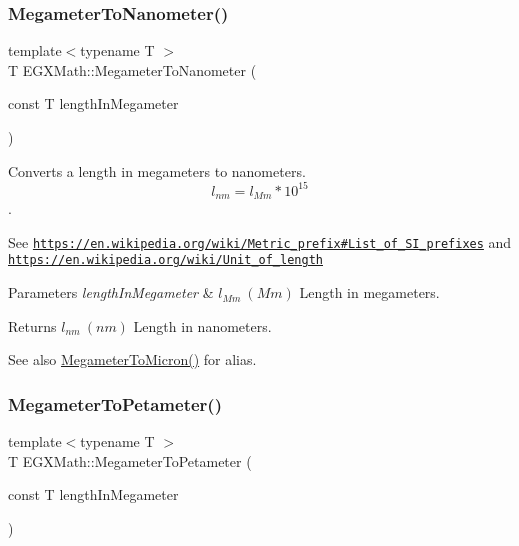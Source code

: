 \subsubsection{\texorpdfstring{Megameter\+To\+Nanometer()}{MegameterToNanometer()}}
{\footnotesize\ttfamily template$<$typename T $>$ \\
T E\+G\+X\+Math\+::\+Megameter\+To\+Nanometer (\begin{DoxyParamCaption}\item[{const T}]{length\+In\+Megameter }\end{DoxyParamCaption})}



Converts a length in megameters to nanometers. \[ l_{nm}=l_{Mm} * 10^{15} \]. 

See \href{https://en.wikipedia.org/wiki/Metric_prefix#List_of_SI_prefixes}{\tt https\+://en.\+wikipedia.\+org/wiki/\+Metric\+\_\+prefix\#\+List\+\_\+of\+\_\+\+S\+I\+\_\+prefixes} and \href{https://en.wikipedia.org/wiki/Unit_of_length}{\tt https\+://en.\+wikipedia.\+org/wiki/\+Unit\+\_\+of\+\_\+length} 
\begin{DoxyParams}{Parameters}
{\em length\+In\+Megameter} & $ l_{Mm}\ (Mm)$ Length in megameters. \\
\hline
\end{DoxyParams}
\begin{DoxyReturn}{Returns}
$ l_{nm}\ (nm)$ Length in nanometers. 
\end{DoxyReturn}
\begin{DoxySeeAlso}{See also}
\mbox{\hyperlink{group___e_g_x_math-_conversions-_length_conversions-_megameter-_non-_s_i_ga14e6b356b28257b1bde9cb9ebf6bc3c6}{Megameter\+To\+Micron()}} for alias. 
\end{DoxySeeAlso}
\mbox{\label{group___e_g_x_math-_conversions-_length_conversions-_megameter-_s_i_gad40646b8456e092061f26bc6c6c65925}} 
\subsubsection{\texorpdfstring{Megameter\+To\+Petameter()}{MegameterToPetameter()}}
{\footnotesize\ttfamily template$<$typename T $>$ \\
T E\+G\+X\+Math\+::\+Megameter\+To\+Petameter (\begin{DoxyParamCaption}\item[{const T}]{length\+In\+Megameter }\end{DoxyParamCaption})}



